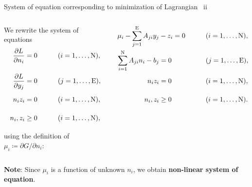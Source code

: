 %
%
\begin{frame}{System of equation corresponding to minimization of Lagrangian \, ii}

\small
\begin{columns}[c]
%
%
We rewrite the system of equations \\[10pt]
%
\begin{alignat*}{2}
\frac{\partial L}{\partial n_{i}} & =0 & \qquad\vphantom{\frac{\partial L}{\partial y_{j}}} & (i=1,\ldots,\text{N}),\\[10pt]
\frac{\partial L}{\partial y_{j}} & =0 & \vphantom{\frac{\partial L}{\partial y_{j}}} & (j=1,\ldots,\text{E}),\\
n_{i}z_{i} & =0 & \vphantom{\frac{\partial L}{\partial y_{j}}} & (i=1,\ldots,\text{N}),\\
n_{i},z_{i} & \geq0 & \vphantom{\frac{\partial L}{\partial y_{j}}} & (i=1,\ldots,\text{N}),
\end{alignat*}
%
using the definition of $\mu_{i}\coloneqq\partial G/\partial n_{i}$: 
\pause
\begin{overprint}
\begin{alignat*}{2}
\mu_{i}-\sum_{j=1}^{\text{E}}A_{ji}y_{j} & -z_{i}=0 & \qquad\vphantom{\frac{\partial L}{\partial y_{j}}} & (i=1,\ldots,\text{N}),\\
\sum_{i=1}^{\text{N}}A_{ji}n_{i}-b_{j} & =0 & \vphantom{\frac{\partial L}{\partial y_{j}}} & (j=1,\ldots,\text{E}),\\
n_{i}z_{i} & =0 & \vphantom{\frac{\partial L}{\partial y_{j}}} & (i=1,\ldots,\text{N}),\\
n_{i},z_{i} & \geq0 & \vphantom{\frac{\partial L}{\partial y_{j}}} & (i=1,\ldots,\text{N}).
\end{alignat*}
\end{overprint}
\end{columns}
\pause
\vskip 10pt
\alert{\bf Note}: Since $\mu_{i}$ is a function of unknown $n_{i}$, we obtain {\bf non-linear system of equation}.

\end{frame}

